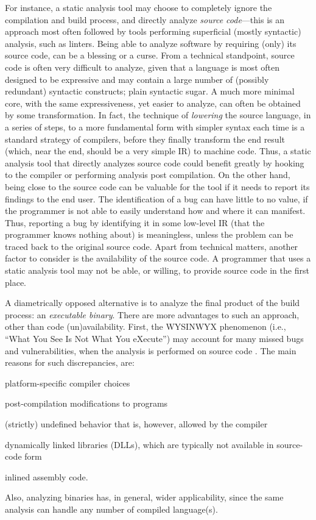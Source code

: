 For instance, a static analysis tool may choose to completely ignore
the compilation and build process, and directly analyze \emph{source
  code}---this is an approach most often followed by tools performing
superficial (mostly syntactic) analysis, such as linters. Being able
to analyze software by requiring (only) its source code, can be a
blessing or a curse. From a technical standpoint, source code is often
very difficult to analyze, given that a language is most often
designed to be expressive and may contain a large number of (possibly
redundant) syntactic constructs; plain syntactic sugar. A much more
minimal core, with the same expressiveness, yet easier to analyze, can
often be obtained by some transformation. In fact, the technique of
\emph{lowering} the source language, in a series of steps, to a more
fundamental form with simpler syntax each time is a standard strategy
of compilers, before they finally transform the end result (which,
near the end, should be a very simple IR) to machine code. Thus, a
static analysis tool that directly analyzes source code could benefit
greatly by hooking to the compiler or performing analysis post
compilation.
%
On the other hand, being close to the source code can be valuable for
the tool if it needs to report its findings to the end user. The
identification of a bug can have little to no value, if the programmer
is not able to easily understand how and where it can manifest. Thus,
reporting a bug by identifying it in some low-level IR (that the
programmer knows nothing about) is meaningless, unless the problem can
be traced back to the original source code.
%
Apart from technical matters, another factor to consider is the
availability of the source code. A programmer that uses a static
analysis tool may not be able, or willing, to provide source code
in the first place.

A diametrically opposed alternative is to analyze the final product of
the build process: an \emph{executable binary}. There are more
advantages to such an approach, other than code
(un)availability. First, the WYSINWYX phenomenon (i.e., ``What You See
Is Not What You eXecute'') may account for many missed bugs and
vulnerabilities, when the analysis is performed on source code
\cite{toplas/BalakrishnanR10}. The main reasons for such
discrepancies, are:
\begin{compactitem}[\(\cdot\)]
\item platform-specific compiler choices
\item post-compilation modifications to programs
\item (strictly) undefined behavior that is, however, allowed by the
  compiler
\item dynamically linked libraries (DLLs), which are typically not
  available in source-code form
\item inlined assembly code.
\end{compactitem}
Also, analyzing binaries has, in general, wider applicability, since
the same analysis can handle any number of compiled language(s).

